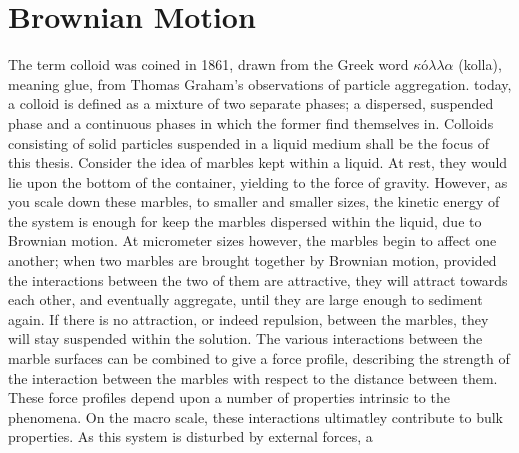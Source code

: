 \section{Brownian Motion}
The term colloid was coined in 1861, drawn from the Greek word $κόλλα$ (kolla), meaning glue, from Thomas Graham's observations of particle aggregation\cite{old_colloid}. %
today, a colloid is defined as %
a mixture of two separate phases; a dispersed, suspended phase and a continuous%
phases in which the former find themselves in. %
Colloids consisting of solid particles suspended in a liquid medium shall be the focus of this thesis.\cite{review_colloid1}
Consider the idea of marbles kept within a liquid. At rest, they would lie upon the bottom of the container, yielding to the force of gravity\cite{Neuton}. However, as you scale down these marbles, to smaller and smaller sizes, the kinetic energy of the system is enough for keep the marbles dispersed within the liquid, due to Brownian motion\cite{Brown}.
At micrometer sizes however, the marbles begin to affect one another; when two marbles are brought together by Brownian motion, provided the interactions between the two of them are attractive, they will attract towards each other, and eventually aggregate, until they are large enough to sediment again. If there is no attraction, or indeed repulsion, between the marbles, they will stay suspended within the solution.
The various interactions between the marble surfaces can be combined to give a force profile, describing the strength of the interaction between the marbles with respect to the distance between them.
These force profiles depend upon a number of %
properties intrinsic to the phenomena. %
On the macro scale, these interactions %
ultimatley contribute to bulk properties. As this system is disturbed by external forces, a 
